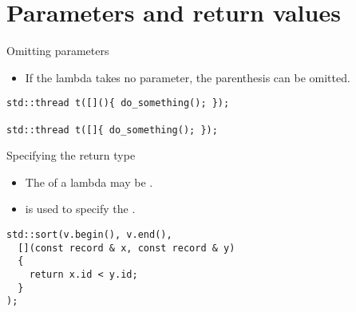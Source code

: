 \section{Parameters and return values}

\begin{frame}[t,fragile]{Omitting parameters}
  \begin{itemize}
    \item If the lambda takes no parameter, the parenthesis can be omitted.
  \end{itemize}
\begin{lstlisting}
std::thread t([](){ do_something(); });

std::thread t([]{ do_something(); });
\end{lstlisting}
\end{frame}

\begin{frame}[t,fragile]{Specifying the return type}
  \begin{itemize}
    \item The  of a lambda may be 
          .
    \item {} is used to specify the .
  \end{itemize}
\pause
\begin{lstlisting}
std::sort(v.begin(), v.end(), 
  [](const record & x, const record & y)
  { 
    return x.id < y.id;
  }
);
\end{lstlisting}
\end{frame}

